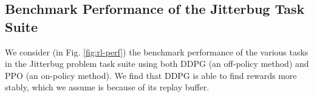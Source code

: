 \documentclass[letterpaper, 10 pt, conference]{ieeeconf}
\begin{document}








\appendix
\subsection*{Benchmark Performance of the Jitterbug Task Suite}\label{sec:app}

We consider (in Fig. \ref{fig:rl-perf}) the benchmark performance of the various tasks in the Jitterbug problem task suite using both DDPG \cite{DDPG} (an off-policy method) and PPO \cite{PPO} (an on-policy method).  We find that DDPG is able to find rewards more stably, which we assume is because of its replay buffer. %



\end{document}
